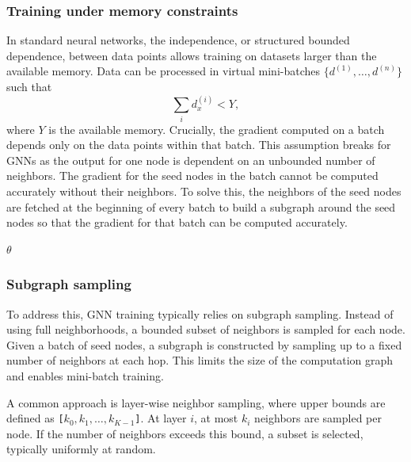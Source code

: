 \documentclass[PhD]{uclathes}
\begin{document}
\subsubsection{Training under memory constraints}
In standard neural networks, the independence, or structured bounded
dependence, between data points allows training on datasets larger than the
available memory. Data can be processed in virtual mini-batches
$\{d^{(1)}, \dots, d^{(n)}\}$ such that
\[
\sum_i d_x^{(i)} < Y,
\]
where $Y$ is the available memory. Crucially, the gradient computed on a batch
depends only on the data points within that batch. This assumption breaks for
GNNs as the output for one node is dependent on an unbounded number of
neighbors. The gradient for the seed nodes in the batch cannot be computed
accurately without their neighbors. To solve this, the neighbors of the seed
nodes are fetched at the beginning of every batch to build a subgraph around the
seed nodes so that the gradient for that batch can be computed accurately.

\begin{algorithm}[H]
\label{algo:sampling}
\footnotesize
\caption{Mini-batch GNN Training (Single Epoch)}
\DontPrintSemicolon
{}
\KwOut{$\theta$}
\Return $\theta$\;
\end{algorithm}

\subsubsection{Subgraph sampling}
To address this, GNN training typically relies on subgraph sampling. Instead of
using full neighborhoods, a bounded subset of neighbors is sampled for each
node. Given a batch of seed nodes, a subgraph is constructed by sampling up to
a fixed number of neighbors at each hop. This limits the size of the
computation graph and enables mini-batch training.

A common approach is layer-wise neighbor sampling, where upper bounds are
defined as \texttt{[$k_0, k_1, \ldots, k_{K-1}$]}. At layer $i$, at most $k_i$
neighbors are sampled per node. If the number of neighbors exceeds this bound,
a subset is selected, typically uniformly at random.
\end{document}
